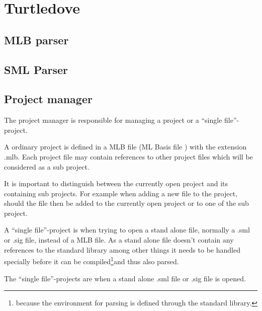 
\section{Turtledove}
\label{sec:design-turtledove}


\subsection{MLB parser}
\label{sec:design-mlb-parser}

\subsection{SML Parser}
\label{sec:design-sml-parser}


\subsection{Project manager}
\label{sec:design-project-manager}


The project manager is responsible for managing a project or a ``single
file''-project. 

A ordinary project is defined in a MLB file (ML Basis file \cite{mlbasis}) with the extension
.mlb. Each project file may contain references to other project files which will
be considered as a sub project.  

It is important to distinguish between the currently open project and its
containing sub projects. For example when adding a new file to the project,
should the file then be added to the currently open project or to one of the sub
project.


A ``single file''-project is when trying to open a stand alone file, normally a
.sml or .sig file, instead of a MLB file. As a stand alone file doesn't contain
any references to the standard library among other things it needs to be handled
specially before it can be compiled\footnote{because the environment for parsing
  is defined through the standard library.}and thus also parsed.



The ``single file''-projects are when a stand alone .sml file or .sig file is
opened.



